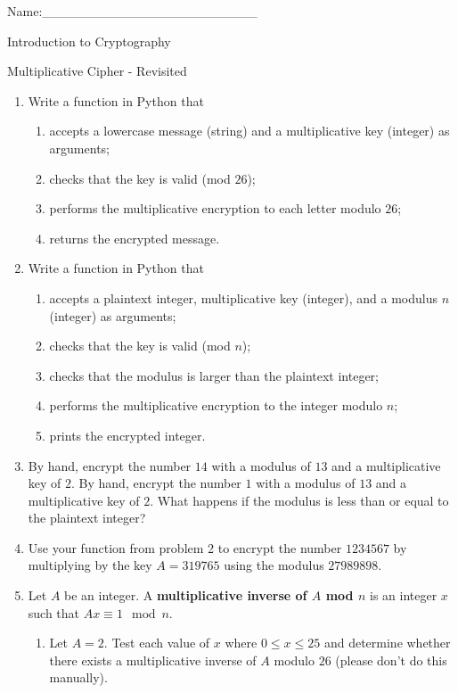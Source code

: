 \documentclass[12pt]{amsart}
\theoremstyle{definition}
\theoremstyle{remark}
\numberwithin{equation}{section}
\begin{document}
\begin{flushright}
Name:\_\_\_\_\_\_\_\_\_\_\_\_\_\_\_\_\_\_\_\_\_\_\_
\end{flushright}
\vspace{10pt}
\begin{center}
Introduction to Cryptography

Multiplicative Cipher - Revisited
\end{center}


\begin{enumerate}
\item Write a function in Python that 
\begin{enumerate}
\item accepts a lowercase message (string) and a multiplicative key (integer) as arguments;
\item checks that the key is valid (mod $26$);
\item performs the multiplicative encryption to each letter modulo $26$;
\item returns the encrypted message.
\end{enumerate}
\item Write a function in Python that 
\begin{enumerate}
\item accepts a plaintext integer, multiplicative key (integer), and a modulus $n$ (integer) as arguments;
\item checks that the key is valid (mod $n$);
\item checks that the modulus is larger than the plaintext integer;
\item performs the multiplicative encryption to the integer modulo $n$;
\item prints the encrypted integer.
\end{enumerate}
\item By hand, encrypt the number $14$ with a modulus of $13$ and a multiplicative key of $2$. By hand, encrypt the number $1$ with a modulus of $13$ and a multiplicative key of $2$. What happens if the modulus is less than or equal to the plaintext integer?
\item Use your function from problem 2 to encrypt the number $1234567$ by multiplying by the key $A=319765$ using the modulus $27989898$.
\item Let $A$ be an integer. A {\bf multiplicative inverse of $A$ mod $n$} is an integer $x$ such that $Ax\equiv 1 \mod n$. 
\begin{enumerate}
\item Let $A=2$. Test each value of $x$ where $0\leq x \leq 25$ and determine whether there exists a multiplicative inverse of $A$ modulo $26$ (please don't do this manually).

\end{enumerate}
\end{enumerate}
\end{document}
